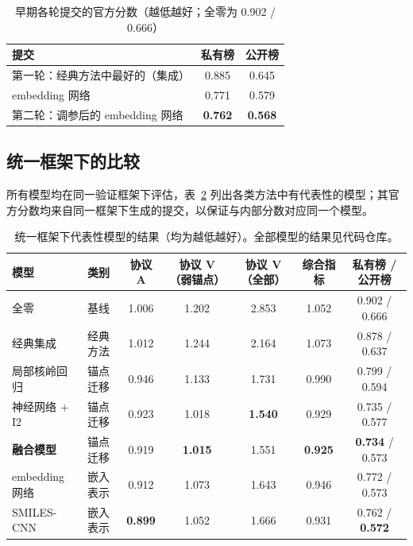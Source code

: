 \documentclass[11pt,a4paper]{article}
\begin{document}
\begin{table}[!ht]
\centering\small
\caption{早期各轮提交的官方分数（越低越好；全零为 0.902 / 0.666）}\label{tab:history}
\begin{tabular}{@{}lcc@{}}
\toprule
提交 & 私有榜 & 公开榜 \\
\midrule
第一轮：经典方法中最好的（集成） & 0.885 & 0.645 \\
embedding 网络 & 0.771 & 0.579 \\
第二轮：调参后的 embedding 网络 & \textbf{0.762} & \textbf{0.568} \\
\bottomrule
\end{tabular}
\end{table}

\subsection{统一框架下的比较}
所有模型均在同一验证框架下评估，表~\ref{tab:main} 列出各类方法中有代表性的模型；其官方分数均来自同一框架下生成的提交，以保证与内部分数对应同一个模型。

\begin{table}[!ht]
\centering\small
\caption{统一框架下代表性模型的结果（均为越低越好）。全部模型的结果见代码仓库。}\label{tab:main}
\setlength{\tabcolsep}{4pt}
\begin{tabular}{@{}llccccc@{}}
\toprule
模型 & 类别 & 协议 A & 协议 V（弱锚点） & 协议 V（全部） & 综合指标 & 私有榜 / 公开榜 \\
\midrule
全零 & 基线 & 1.006 & 1.202 & 2.853 & 1.052 & 0.902 / 0.666 \\
经典集成 & 经典方法 & 1.012 & 1.244 & 2.164 & 1.073 & 0.878 / 0.637 \\
\midrule
局部核岭回归 & 锚点迁移 & 0.946 & 1.133 & 1.731 & 0.990 & 0.799 / 0.594 \\
神经网络 + I2 & 锚点迁移 & 0.923 & 1.018 & \textbf{1.540} & 0.929 & 0.735 / 0.577 \\
\textbf{融合模型} & 锚点迁移 & 0.919 & \textbf{1.015} & 1.551 & \textbf{0.925} & \textbf{0.734} / 0.573 \\
\midrule
embedding 网络 & 嵌入表示 & 0.912 & 1.073 & 1.643 & 0.946 & 0.772 / 0.573 \\
SMILES-CNN & 嵌入表示 & \textbf{0.899} & 1.052 & 1.666 & 0.931 & 0.762 / \textbf{0.572} \\
\bottomrule
\end{tabular}
\end{table}
\end{document}

